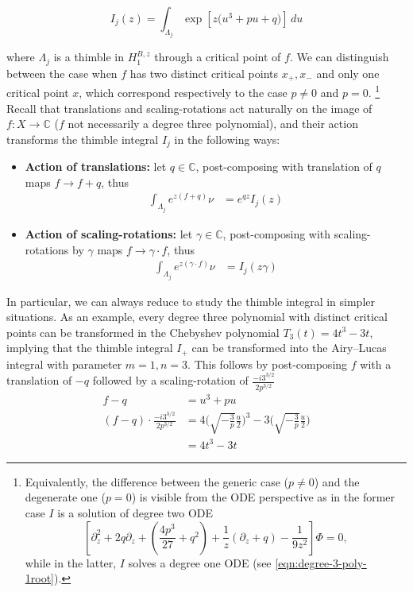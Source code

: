\documentclass{article}
\newcommand{\C}{\mathbb{C}}
\theoremstyle{definition}
\theoremstyle{plain}
\begin{document}
\[ I_j(z) = \int_{\Lambda_j} \exp\left[z\big(u^3 + pu + q)\right]\,du \]

where $\Lambda_j$ is a thimble in $H_{1}^{B,z}$ through a critical point of $f$. We can distinguish between the case when $f$ has two distinct critical points $x_+, x_-$ and only one critical point $x$, which correspond respectively to the case $p\neq 0$ and $p=0$. \footnote{Equivalently, the difference between the generic case ($p\neq 0$) and the degenerate one ($p=0$) is visible from the ODE perspective as in the former case $I$ is a solution of degree two ODE \[\left[\partial_z^2 +2q \partial_z+\left(\frac{4p^3}{27}+q^2\right)+\frac{1}{z}\left(\partial_z +q \right)-\frac{1}{9z^2}\right]\Phi=0,\] while in the latter, $I$ solves a degree one ODE (see \eqref{eqn:degree-3-poly-1root}).}
Recall that translations and scaling-rotations act naturally on the image of $f\colon X\to \C$ ($f$ not necessarily a degree three polynomial), and their action transforms the thimble integral $I_j$ in the following ways:
\begin{itemize}
    \item \textbf{Action of translations:} let $q\in\C$, post-composing with translation of $q$ maps $f\to f+q$, thus 
    \begin{align*}
        \int_{\Lambda_j}e^{z (f+q)} \nu &= e^{qz} I_j(z)
    \end{align*}
    \item  \textbf{Action of scaling-rotations:} let $\gamma\in\C$, post-composing with scaling-rotations by $\gamma$ maps $f\to \gamma\cdot f$, thus 
    \begin{align*}
        \int_{\Lambda_j}e^{z (\gamma\cdot f)} \nu &= I_j(z \gamma)
    \end{align*}
\end{itemize}
In particular, we can always reduce to study the thimble integral in simpler situations. 
As an example, every degree three polynomial with distinct critical points can be transformed in the Chebyshev polynomial $T_3(t)=4 t^3-3t$, implying that the thimble integral $I_+$ can be transformed into the Airy--Lucas integral with parameter $m=1, n=3$. This follows by post-composing $f$ with a translation of $-q$ followed by a scaling-rotation of $\frac{ -i 3^{3/2}}{2 p^{3/2}}$
\begin{align*}
    f-q &= u^3 + pu \\
    (f-q) \cdot \frac{ -i 3^{3/2}}{2 p^{3/2}} &= 4 \Big(\sqrt{-\tfrac{3}{p}} \tfrac{u}{2} \Big)^{3} - 3\Big(\sqrt{-\tfrac{3}{p}} \tfrac{u}{2} \Big) \\
    &= 4 t^3- 3t 
\end{align*}
\end{document}
